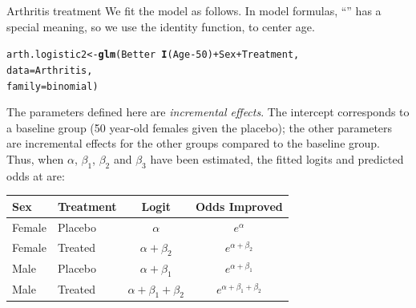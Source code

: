 \documentclass[11pt]{book}\usepackage[]{graphicx}\usepackage[]{color}
\makeatletter
\newcommand{\hlnum}[1]{\textcolor[rgb]{0.686,0.059,0.569}{#1}}%
\newcommand{\hlopt}[1]{\textcolor[rgb]{0,0,0}{#1}}%
\newcommand{\hlstd}[1]{\textcolor[rgb]{0.345,0.345,0.345}{#1}}%
\newcommand{\hlkwb}[1]{\textcolor[rgb]{0.69,0.353,0.396}{#1}}%
\newcommand{\hlkwc}[1]{\textcolor[rgb]{0.333,0.667,0.333}{#1}}%
\newcommand{\hlkwd}[1]{\textcolor[rgb]{0.737,0.353,0.396}{\textbf{#1}}}%
\newenvironment{kframe}{%
 \def\at@end@of@kframe{}%
 \ifinner\ifhmode%
  \def\at@end@of@kframe{\end{minipage}}%
  \begin{minipage}{\columnwidth}%
 \fi\fi%
 \def\FrameCommand##1{\hskip\@totalleftmargin \hskip-\fboxsep
 \colorbox{shadecolor}{##1}\hskip-\fboxsep
     \hskip-\linewidth \hskip-\@totalleftmargin \hskip\columnwidth}%
 \MakeFramed {\advance\hsize-\width
   \@totalleftmargin\z@ \linewidth\hsize
   \@setminipage}}%
 {\par\unskip\endMakeFramed%
 \at@end@of@kframe}
\newenvironment{knitrout}{}{} %
\renewenvironment{knitrout}{\small\renewcommand{\baselinestretch}{.85}}{} %
\makeatother
\begin{document}
\begin{Example}{Arthritis treatment}
We fit the model as follows.  In  model formulas, ``\code{-}'' has a special meaning, so we use
the identity function,  to center age.
\begin{knitrout}
\color{fgcolor}\begin{kframe}
\begin{alltt}
\hlstd{arth.logistic2} \hlkwb{<-} \hlkwd{glm}\hlstd{(Better} \hlopt{~} \hlkwd{I}\hlstd{(Age}\hlopt{-}\hlnum{50}\hlstd{)} \hlopt{+} \hlstd{Sex} \hlopt{+} \hlstd{Treatment,}
                      \hlkwc{data}\hlstd{=Arthritis,}
                      \hlkwc{family}\hlstd{=binomial)}
\end{alltt}
\end{kframe}
\end{knitrout}


The parameters defined here are \emph{incremental effects}.  The
intercept corresponds to a baseline group (50 year-old females given the placebo);
the other parameters are incremental effects for the other groups
compared to the baseline group.
Thus, when \(\alpha\), \(\beta _1\), \(\beta _2\) and \(\beta _3\)  have
been estimated, the fitted logits and predicted odds at  are:

\begin{center}
\vspace{1ex}
{\renewcommand{\arraystretch}{1.2}
\begin{tabular}{|ll|cc|}
\hline
Sex  &  Treatment & Logit & Odds Improved  \\[.5ex] \hline

Female  & Placebo  & \(\alpha \) & \(e^{\alpha}\) \\
Female   & Treated  & \(\alpha + \beta_2 \) & \(e^{\alpha + \beta_2 }\) \\
Male & Placebo & \(\alpha + \beta_1 \) & \(e^{\alpha + \beta_1 }\) \\
Male & Treated & \(\alpha + \beta_1 + \beta_2\) & \(e^{\alpha + \beta_1 + \beta_2}\)  \\  \hline
\end{tabular}
}
\end{center}


\end{Example}
\end{document}
